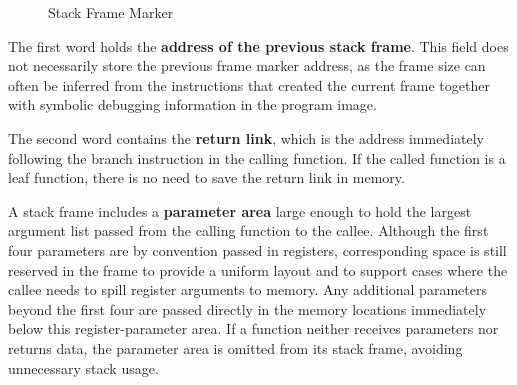 \begin{figure}[H]
\begin{center}
\end{center}
\caption{Stack Frame Marker}
\label{fig:Stack Frame Marker}
\end{figure}

The first word holds the \textbf{address of the previous stack frame}. This field does not necessarily store the previous frame marker address, as the frame size can often be inferred from the instructions that created the current frame together with symbolic debugging information in the program image.

The second word contains the \textbf{return link}, which is the address immediately following the branch instruction in the calling function. If the called function is a leaf function, there is no need to save the return link in memory.


A stack frame includes a \textbf{parameter area} large enough to hold the largest argument list passed from the calling function to the callee. Although the first four parameters are by convention passed in registers, corresponding space is still reserved in the frame to provide a uniform layout and to support cases where the callee needs to spill register arguments to memory. Any additional parameters beyond the first four are passed directly in the memory locations immediately below this register-parameter area. If a function neither receives parameters nor returns data, the parameter area is omitted from its stack frame, avoiding unnecessary stack usage. 


